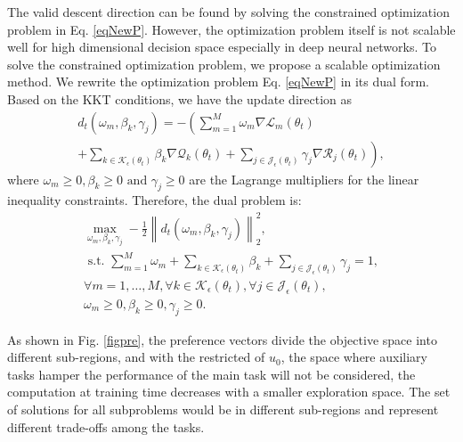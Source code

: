 \documentclass[final]{cvpr}
\begin{document}
The valid descent direction can be found by solving the constrained optimization problem in Eq. \ref{eqNewP}. 
However, the optimization problem itself is not scalable well for high dimensional decision space especially in deep neural networks. To solve the constrained optimization problem, we propose a scalable optimization method. 
We rewrite the optimization problem Eq. \ref{eqNewP} in its dual form. Based on the KKT conditions, we have the update direction as
\begin{equation}\label{dUp}
	\begin{array}{c} d_{t} \left( \omega_{m}, \beta_{k}, \gamma_{j} \right) =-\left(\sum_{m=1}^{M} \omega_{m}  \nabla \mathcal{L}_{m}\left(\theta_{t} \right) 
	\right. \\ \left. 	+\sum_{k \in \mathcal{K}_\epsilon(\theta_{t})}\beta_{k}  \nabla \mathcal{Q}_{k}\left(\theta_{t} \right)  
	 + \sum_{j \in \mathcal{J}_\epsilon(\theta_{t}) } \gamma_{j}\nabla \mathcal{R}_j(\theta_t ) \right),\end{array}
\end{equation}
where $\omega_{m} \geq 0 , \beta_{k} \geq 0 \text { and } \gamma_{j} \geq 0$ are the Lagrange multipliers for the linear inequality constraints. Therefore, the dual problem is:
\begin{equation}\label{dualP}
	\begin{array}{c}\max_{\omega_{m}, \beta_{k}, \gamma_{j}} -\frac{1}{2}\left\| d_{t} \left( \omega_{m}, \beta_{k}, \gamma_{j} \right)  \right\|^{2}_2 , \\  
	 
	\text { s.t. }  
	\sum_{m=1}^{M} \omega_{m} +\sum_{k \in \mathcal{K}_\epsilon(\theta_t)} \beta_{k}  + \sum_{j \in \mathcal{J}_\epsilon(\theta_t)} \gamma_{j} =1, \\ 

	 \forall m=1, \ldots, M, \forall  k \in \mathcal{K}_\epsilon(\theta_t), \forall j \in \mathcal{J}_\epsilon(\theta_t), \\ 
	 	\omega_{m} \geq 0,  \beta_{k} \geq 0, \gamma_{j} \geq 0.\end{array}
\end{equation}


As shown in Fig. \ref{figpre}, the preference vectors divide the objective space into different sub-regions,  and with the restricted of $u_0$, the space where auxiliary tasks hamper the performance of the main task will not be considered, the computation at training time decreases with a smaller exploration space.
The set of solutions for all subproblems would be in different sub-regions and represent different trade-offs among the tasks.
 
\end{document}
